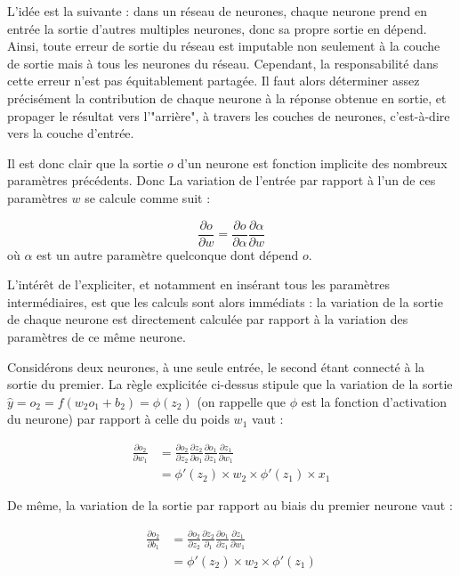 L'idée est la suivante : dans un réseau de neurones, chaque neurone prend en entrée la sortie d'autres multiples neurones, donc sa propre sortie en dépend. Ainsi, toute erreur de sortie du réseau est imputable non seulement à la couche de sortie mais à tous les neurones du réseau. Cependant, la responsabilité dans cette erreur n'est pas équitablement partagée. Il faut alors déterminer assez précisément la contribution de chaque neurone à la réponse obtenue en sortie, et propager le résultat vers l'"arrière", à travers les couches de neurones, c'est-à-dire vers la couche d'entrée. 

Il est donc clair que la sortie \(o\) d'un neurone est fonction implicite des nombreux paramètres précédents. Donc La variation de l'entrée par rapport à l'un de ces paramètres \(w\) se calcule comme suit : 

\begin{equation}\label{eq:deriv_compos}
\frac{\partial o}{\partial w} = \frac{\partial o}{\partial \alpha} \frac{\partial \alpha}{\partial w}
\end{equation}
où \(\alpha\) est un autre paramètre quelconque dont dépend \(o\).

L'intérêt de l'expliciter, et notamment en insérant tous les paramètres intermédiaires, est que les calculs sont alors immédiats : la variation de la sortie de chaque neurone est directement calculée par rapport à la variation des paramètres de ce même neurone.

Considérons deux neurones, à une seule entrée, le second étant connecté à la sortie du premier. La règle explicitée ci-dessus stipule que la variation de la sortie \(\hat{y} = o_2 = f(w_2 o_1 + b_2) = \phi(z_2)\) (on rappelle que \(\phi\) est la fonction d'activation du neurone) par rapport à celle du poids \(w_1\) vaut : 

\begin{align*}
\frac{\partial o_2}{\partial w_1} &= \frac{\partial o_2}{\partial z_2} \frac{\partial z_2}{\partial o_1} \frac{\partial o_1}{\partial z_1} \frac{\partial z_1}{\partial w_1}\\
&= \phi'(z_2) \times w_2 \times \phi'(z_1) \times x_1
\end{align*}

De même, la variation de la sortie par rapport au biais du premier neurone vaut : 

\begin{align*}
\frac{\partial o_2}{\partial b_1} &= \frac{\partial o_2}{\partial z_2} \frac{\partial z_2}{\partial _1} \frac{\partial o_1}{\partial z_1} \frac{\partial z_1}{\partial w_1}\\
&= \phi'(z_2) \times w_2 \times \phi'(z_1)\\
\end{align*}

